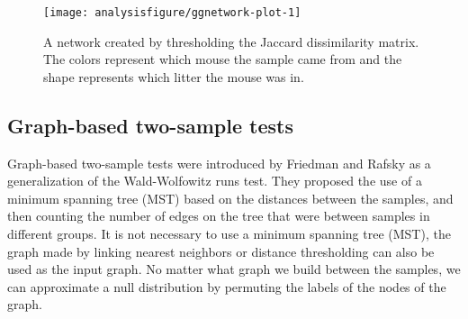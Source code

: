 \begin{figure}[H]
\begin{knitrout}
\color{fgcolor}\begin{kframe}
\begin{alltt}
 \hlstd{(}         \hlstd{=} \hlstd{)} \hlopt{+}
  \hlstd{(} \hlstd{=} \hlstd{)} \hlopt{+}
  \hlstd{(}\hlstd{(}    \hlopt{+}
  \hlstd{(} \hlstd{=} \hlstd{(),}  \hlstd{=} \hlstd{(),}
         \hlstd{=} \hlstd{(}\hlstd{,}\hlstd{))} \hlopt{+}
  \hlstd{(} \hlstd{=} \hlstd{(} \hlstd{=} \hlstd{(} \hlstd{=} \hlstd{)))}
\end{alltt}
\end{kframe}

{\centering \texttt{[image: analysisfigure/ggnetwork-plot-1]} 

}



\end{knitrout}
\caption{A network created by thresholding the Jaccard dissimilarity
  matrix. The colors represent which mouse the sample came from and
  the shape represents which litter the mouse was in.}
\label{fig:ggnetwork}
\end{figure}

\subsection*{Graph-based two-sample tests}

Graph-based two-sample tests were introduced by Friedman and Rafsky
\cite{friedman1979multivariate} as a generalization of the
Wald-Wolfowitz runs test. They proposed the use of a minimum spanning tree (MST)
based on the distances between the samples, and then counting the number
of edges on the tree that were between samples in different
groups. It is not necessary to use a minimum spanning tree (MST), the
graph made by linking nearest neighbors
\cite{schilling1986multivariate} or  distance thresholding can also
be used as the input graph. No matter what graph we build between the samples, we can
approximate a null distribution by permuting the labels of the nodes of the graph.

